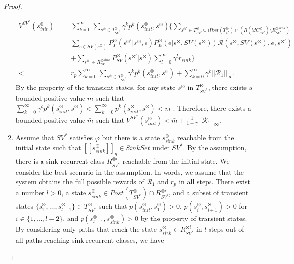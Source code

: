 \documentclass[10pt]{article}
\theoremstyle{definition}
\newcommand{\myspqsink}{\ensuremath{[\![s^{\otimes}_{sink}]\!]}_q}
\begin{document}
\begin{proof}
\begin{enumerate}
  \begin{align}
    V^{SV^{\ast}}\!(s^{\otimes}_{init})
     =\ & \sum_{k=0}^{\infty} \sum_{s^{\otimes} \in T^{\otimes}_{SV^{\ast}}} \gamma^k p^k(s^{\otimes}_{init}, s^{\otimes}) \{ \sum_{s^{\otimes \prime} \in T^{\otimes}_{SV^{\ast}} \cup ( Post(T^{\otimes}_{\pi^{\ast}}) \cap (R(MC^{\otimes}_{SV^{\ast}}) \setminus R^{\otimes sink}_{SV^{\ast}})}  \nonumber \\
     & \sum_{e \in SV(s^{\otimes})} P^{\otimes}_T (s^{\otimes \prime} | s^{\otimes}, e) P^{\otimes}_E (e | s^{\otimes}, SV(s^{\otimes})) \mathcal{R}(s^{\otimes}, SV(s^{\otimes}), e, s^{\otimes \prime})  \nonumber \\
     & + \sum_{s^{\otimes \prime} \in R^{\otimes sink}_{SV}} P^{\otimes}_{SV}(s^{\otimes \prime}|s^{\otimes}) \sum_{l = 0}^{\infty} \gamma^l r_{sink} \} \nonumber \\
     <\ & r_p \sum_{k=0}^{\infty} \sum_{s^{\otimes} \in T^{\otimes}_{SV^{\ast}}} \gamma^k p^k(s^{\otimes}_{init}, s^{\otimes}) + \sum_{k=0}^{\infty} \gamma^k ||\mathcal{R}_1||_{\infty}. \nonumber
  \label{eqth11}
  \end{align}
  By the property of the transient states, for any state $s^{\otimes}$ in $T^{\otimes}_{SV^{\ast}}$, there exists a bounded positive value $m$ such that $ \sum_{k=0}^{\infty} \gamma^k p^k(s^{\otimes}_{init}, s^{\otimes}) < \sum_{k=0}^{\infty} p^k(s^{\otimes}_{init}, s^{\otimes}) < m$ \cite{ESS}. Therefore, there exists a bounded positive value $\bar{m}$ such that $V^{SV^{\ast}}(s^{\otimes}_{init}) < \bar{m} + \frac{1}{1-\gamma} ||\mathcal{R}_1||_{\infty}$.

  \item Assume that $SV^{\ast}$ satisfies $\varphi$ but there is a state $s^{\otimes}_{sink}$ reachable from the initial state such that $\myspqsink \in SinkSet$ under $SV^{\ast}$. By the assumption, there is a sink recurrent class $R^{\otimes i}_{SV^{\ast}}$ reachable from the initial state. We consider the best scenario in the assumption. In words, we assume that the system obtains the full possible rewards of $\mathcal{R}_1$ and $r_p$ in all steps. There exist a number $l > 0$, a state $s^{\otimes}_{sink} \in Post(T^{\otimes}_{SV^{\ast}}) \cap R^{\otimes i}_{SV^{\ast}}$, and a subset of transient states $\{ s^{\otimes}_1, \ldots , s^{\otimes}_{l-1} \} \subset T^{\otimes}_{SV^{\ast}}$ such that $p(s^{\otimes}_{init}, s^{\otimes}_1)>0$, $p(s^{\otimes}_{i}, s^{\otimes}_{i+1})>0$ for $i \in \{ 1,...,l-2 \}$, and $p(s^{\otimes}_{l-1}, s^{\otimes}_{sink})>0$ by the property of transient states. By considering only paths that reach the state $s^{\otimes}_{sink} \in R^{\otimes i}_{SV^{\ast}}$ in $l$ steps out of all paths reaching sink recurrent classes, we have


\end{enumerate}
\end{proof}
\end{document}
